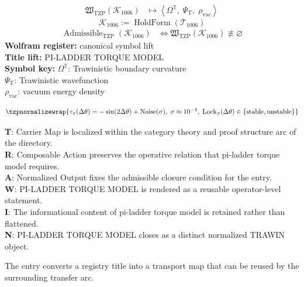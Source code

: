 \noindent
\begin{minipage}[t]{0.48\linewidth}
\begingroup
\small
\[
\begin{aligned}
\mathfrak{W}_{\mathrm{TZP}}\!\left(\mathcal{K}_{1006}\right)
&\longmapsto
\left\langle \Omega^{\mathbb{T}},\; \Psi_{\mathrm{T}},\; \rho_{\mathrm{vac}} \right\rangle
\end{aligned}
\]
\[
\mathcal{K}_{1006}
:=
\operatorname{HoldForm}\!\left(\mathcal{T}_{1006}\right)
\]
\[
\begin{aligned}
\operatorname{Admissible}_{\mathrm{TZP}}\!\left(\mathcal{K}_{1006}\right)
&\Longleftrightarrow
\mathfrak{W}_{\mathrm{TZP}}\!\left(\mathcal{K}_{1006}\right)\not\equiv\varnothing
\end{aligned}
\]
\textbf{Wolfram register:} canonical symbol lift\\
\textbf{Title lift:} PI-LADDER TORQUE MODEL\\
\textbf{Symbol key:} \(\Omega^{\mathbb{T}}\): Trawinistic boundary curvature\\ \(\Psi_{\mathrm{T}}\): Trawinistic wavefunction\\ \(\rho_{\mathrm{vac}}\): vacuum energy density
\par
\endgroup
\end{minipage}\hfill
\begin{minipage}[t]{0.48\linewidth}
\[
\tzpnormalizewrap{\tau_{\pi}(\Delta\theta)=-\sin(2\Delta\theta)+\operatorname{Noise}(\sigma),\;
\sigma\approx10^{-4},\;
\operatorname{Lock}_{\pi}(\Delta\theta)\in\{\mathrm{stable},\mathrm{unstable}\}}
\]

\small
\textbf{T}: Carrier Map is localized within the category theory and proof structure arc of the directory.\\
\textbf{R}: Composable Action preserves the operative relation that pi-ladder torque model requires.\\
\textbf{A}: Normalized Output fixes the admissible closure condition for the entry.\\
\textbf{W}: PI-LADDER TORQUE MODEL is rendered as a reusable operator-level statement.\\
\textbf{I}: The informational content of pi-ladder torque model is retained rather than flattened.\\
\textbf{N}: PI-LADDER TORQUE MODEL closes as a distinct normalized TRAWIN object.
\normalsize
\end{minipage}

The entry converts a registry title into a transport map that can be reused by the surrounding transfer arc.
\clearpage

